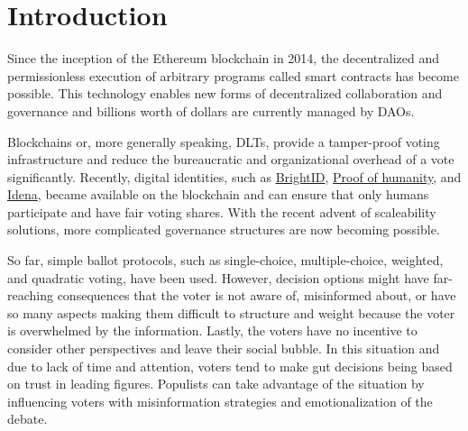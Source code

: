 \documentclass[%
aip,
amsmath,amssymb,
reprint,%
unsortedaddress,
nofootinbib
]{revtex4-2}
\begin{document}
\section{Introduction}

Since the inception of the Ethereum blockchain in 2014\cite{Wood2014}, 
the decentralized and permissionless execution of arbitrary programs 
called smart contracts has become possible. 
This technology enables new forms of decentralized collaboration 
and governance and billions worth of dollars are currently managed by \acp{DAO}.

Blockchains or, more generally speaking, \acp{DLT}, provide a tamper-proof voting infrastructure
and reduce the bureaucratic and organizational overhead of a vote significantly.
Recently, digital identities, such as \href{https://www.brightid.org/}{BrightID}, \href{https://www.proofofhumanity.id/}{Proof of humanity}, and \href{https://www.idena.io/}{Idena},  became available on the blockchain and can ensure that only humans participate and have fair voting shares.
With the recent advent of scaleability solutions,
more complicated governance structures are now becoming possible.

So far, simple ballot protocols, such as 
single-choice, 
multiple-choice, 
weighted,
and quadratic voting, 
have been used.
However, 
decision options might have far-reaching consequences that the voter is not aware of, misinformed about, 
or have so many aspects making them difficult to structure and weight because the voter is overwhelmed by the information.
Lastly, the voters have no incentive to consider other perspectives and leave their social bubble. 
In this situation and due to lack of time and attention, voters tend to make gut decisions being based on trust in leading figures.
Populists can take advantage of the situation by influencing voters with misinformation strategies and emotionalization of the debate.
\end{document}
